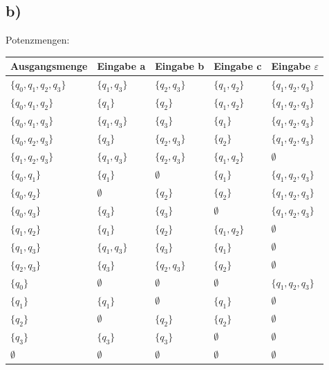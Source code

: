 \subsection*{b)}
Potenzmengen: \\
\begin{tabular}{ l | l | l | l | l }
Ausgangsmenge & Eingabe a & Eingabe b & Eingabe c & Eingabe $\varepsilon$ \\
\hline
$\{ q_0 , q_1 , q_2, q_3 \}$ & $\{  q_1 , q_3 \}$ & $\{ q_2, q_3 \}$ & $\{  q_1 , q_2 \}$ & $\{ q_1 , q_2, q_3 \}$\\
$\{ q_0 , q_1 , q_2 \}$ & $\{ q_1 \}$ & $\{ q_2 \}$ & $\{  q_1 , q_2\}$ & $\{  q_1 , q_2, q_3 \}$\\
$\{ q_0 , q_1 , q_3 \}$ & $\{ q_1 , q_3 \}$ & $\{ q_3 \}$ & $\{ q_1 \}$ & $\{  q_1 , q_2, q_3 \}$\\
$\{ q_0 ,  q_2, q_3 \}$ & $\{ q_3 \}$ & $\{ q_2, q_3 \}$ & $\{ q_2 \}$ & $\{ q_1 , q_2, q_3 \}$\\
$\{ q_1 , q_2, q_3 \}$ & $\{ q_1 , q_3 \}$ & $\{ q_2, q_3 \}$ & $\{ q_1 , q_2 \}$ & $\emptyset $\\ 
$\{ q_0 , q_1  \}$ & $\{ q_1 \}$ & $\emptyset$ & $\{ q_1 \}$ & $\{ q_1 , q_2, q_3 \}$\\
$\{ q_0 , q_2 \}$ & $\emptyset$ & $\{ q_2\}$ & $\{ q_2 \}$ & $\{ q_1 , q_2, q_3 \}$\\
$\{ q_0 , q_3 \}$ & $\{ q_3 \}$ & $\{  q_3 \}$ & $\emptyset$ & $\{ q_1 , q_2, q_3 \}$\\
$\{ q_1 , q_2 \}$ & $\{ q_1  \}$ & $\{ q_2 \}$ & $\{ q_1 , q_2 \}$ & $\emptyset$\\
$\{ q_1 , q_3 \}$ & $\{ q_1 , q_3 \}$ & $\{ q_3 \}$ & $\{  q_1  \}$ & $\emptyset$\\
$\{ q_2, q_3 \}$ & $\{ q_3 \}$ & $\{ q_2, q_3 \}$ & $\{ q_2\}$ & $\emptyset$\\
$\{ q_0 \}$ & $\emptyset$ & $\emptyset$ & $\emptyset$ & $\{ q_1 , q_2, q_3 \}$\\
$\{ q_1 \}$ & $\{ q_1 \}$ & $\emptyset$ & $\{ q_1 \}$ & $\emptyset$\\
$\{ q_2 \}$ & $\emptyset$ & $\{ q_2 \}$ & $\{ q_2 \}$ & $\emptyset$\\
$\{ q_3 \}$ & $\{ q_3 \}$ & $\{ q_3 \}$ & $\emptyset$ & $\emptyset$\\
$\emptyset$ & $\emptyset$ & $\emptyset$ & $\emptyset$ & $\emptyset$\\
\end{tabular}
\\

